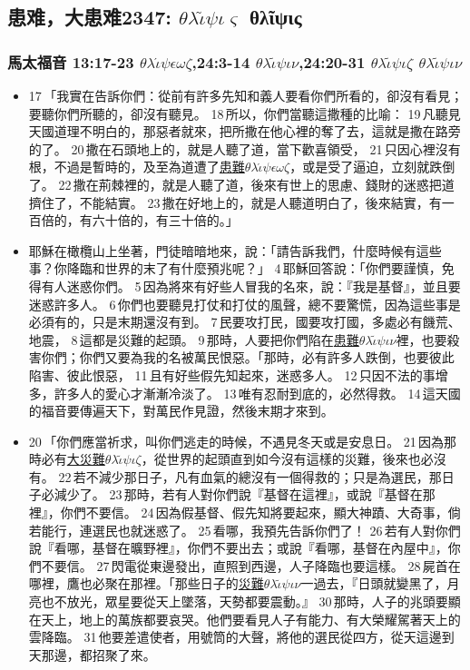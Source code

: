 \subsection{患难，大患难2347: $\theta$$\lambda$$\widetilde{\iota}$$\psi$$\iota$$\varsigma$ θλῖψις}
\subsubsection{馬太福音 13:17-23 $\theta$$\lambda$$\acute{\iota}$$\psi$$\epsilon$$\omega$$\zeta$,24:3-14 $\theta$$\lambda$$\tilde{\iota}$$\psi$$\iota$$\nu$,24:20-31 $\theta$$\lambda$$\tilde{\iota}$$\psi$$\iota$$\zeta$ $\theta$$\lambda$$\tilde{\iota}$$\psi$$\iota$$\nu$}    
\begin{itemize} 
\itemsep-.25em
\item 17 「我實在告訴你們：從前有許多先知和義人要看你們所看的，卻沒有看見；要聽你們所聽的，卻沒有聽見。 18 所以，你們當聽這撒種的比喻： 19 凡聽見天國道理不明白的，那惡者就來，把所撒在他心裡的奪了去，這就是撒在路旁的了。 20 撒在石頭地上的，就是人聽了道，當下歡喜領受， 21 只因心裡沒有根，不過是暫時的，及至為道遭了\underline{患難$\theta$$\lambda$$\acute{\iota}$$\psi$$\epsilon$$\omega$$\zeta$}，或是受了逼迫，立刻就跌倒了。 22 撒在荊棘裡的，就是人聽了道，後來有世上的思慮、錢財的迷惑把道擠住了，不能結實。 23 撒在好地上的，就是人聽道明白了，後來結實，有一百倍的，有六十倍的，有三十倍的。」   
\item 耶穌在橄欖山上坐著，門徒暗暗地來，說：「請告訴我們，什麼時候有這些事？你降臨和世界的末了有什麼預兆呢？」 4 耶穌回答說：「你們要謹慎，免得有人迷惑你們。 5 因為將來有好些人冒我的名來，說：『我是基督』，並且要迷惑許多人。 6 你們也要聽見打仗和打仗的風聲，總不要驚慌，因為這些事是必須有的，只是末期還沒有到。 7 民要攻打民，國要攻打國，多處必有饑荒、地震， 8 這都是災難的起頭。 9 那時，人要把你們陷在\underline{患難$\theta$$\lambda$$\tilde{\iota}$$\psi$$\iota$$\nu$}裡，也要殺害你們；你們又要為我的名被萬民恨惡。「那時，必有許多人跌倒，也要彼此陷害、彼此恨惡， 11 且有好些假先知起來，迷惑多人。 12 只因不法的事增多，許多人的愛心才漸漸冷淡了。 13 唯有忍耐到底的，必然得救。 14 這天國的福音要傳遍天下，對萬民作見證，然後末期才來到。
\item 20 「你們應當祈求，叫你們逃走的時候，不遇見冬天或是安息日。 21 因為那時必有\underline{大災難$\theta$$\lambda$$\tilde{\iota}$$\psi$$\iota$$\zeta$}，從世界的起頭直到如今沒有這樣的災難，後來也必沒有。 22 若不減少那日子，凡有血氣的總沒有一個得救的；只是為選民，那日子必減少了。 23 那時，若有人對你們說『基督在這裡』，或說『基督在那裡』，你們不要信。 24 因為假基督、假先知將要起來，顯大神蹟、大奇事，倘若能行，連選民也就迷惑了。 25 看哪，我預先告訴你們了！ 26 若有人對你們說『看哪，基督在曠野裡』，你們不要出去；或說『看哪，基督在內屋中』，你們不要信。 27 閃電從東邊發出，直照到西邊，人子降臨也要這樣。 28 屍首在哪裡，鷹也必聚在那裡。「那些日子的\underline{災難$\theta$$\lambda$$\tilde{\iota}$$\psi$$\iota$$\nu$}一過去，『日頭就變黑了，月亮也不放光，眾星要從天上墜落，天勢都要震動。』 30 那時，人子的兆頭要顯在天上，地上的萬族都要哀哭。他們要看見人子有能力、有大榮耀駕著天上的雲降臨。 31 他要差遣使者，用號筒的大聲，將他的選民從四方，從天這邊到天那邊，都招聚了來。
\end{itemize}   
    
